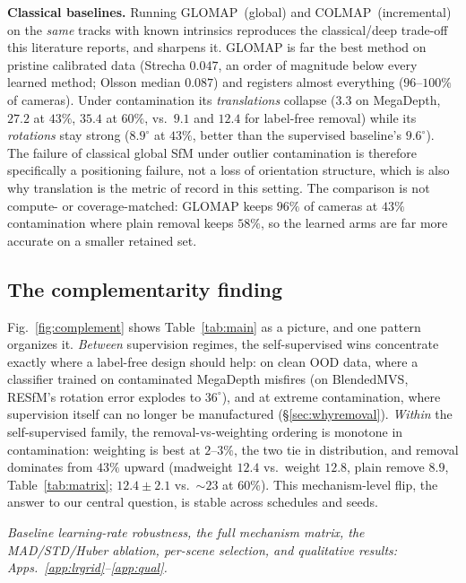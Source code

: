 \documentclass{article}
\newcommand{\mad}{madweight}
\renewcommand{\deg}{^{\circ}}
\begin{document}
\noindent\textbf{Classical baselines.} Running GLOMAP~(global) and COLMAP~(incremental)
on the \emph{same} tracks with known intrinsics reproduces the classical/deep trade-off
this literature reports, and sharpens it. GLOMAP is far the best method on pristine
calibrated data (Strecha $0.047$, an order of magnitude below every learned method;
Olsson median $0.087$) and registers almost everything ($96$--$100\%$ of cameras). Under
contamination its \emph{translations} collapse ($3.3$ on MegaDepth, $27.2$ at $43\%$,
$35.4$ at $60\%$, vs.\ $9.1$ and $12.4$ for label-free removal) while its
\emph{rotations} stay strong ($8.9\deg$ at $43\%$, better than the supervised
baseline's $9.6\deg$). The failure of classical global SfM under outlier contamination is
therefore specifically a positioning failure, not a loss of orientation structure, which
is also why translation is the metric of record in this setting. The comparison is not
compute- or coverage-matched: GLOMAP keeps $96\%$ of cameras at $43\%$ contamination
where plain removal keeps $58\%$, so the learned arms are far more accurate on a smaller
retained set.

\subsection{The complementarity finding}
Fig.~\ref{fig:complement} shows Table~\ref{tab:main} as a picture, and one pattern
organizes it. \emph{Between} supervision regimes, the self-supervised wins concentrate
exactly where a label-free design should help: on clean OOD data, where a classifier
trained on contaminated MegaDepth misfires (on BlendedMVS, RESfM's rotation error explodes
to $36\deg$), and at extreme contamination, where supervision itself can no longer be
manufactured (\S\ref{sec:whyremoval}). \emph{Within} the self-supervised family, the
removal-vs-weighting ordering is monotone in contamination: weighting is best at
$2$--$3\%$, the two tie in distribution, and removal dominates from $43\%$ upward
(\mad{} $12.4$ vs.\ weight $12.8$, plain remove $8.9$, Table~\ref{tab:matrix};
$12.4\pm2.1$ vs.\ $\sim\!23$ at $60\%$). This mechanism-level flip, the answer to our central
question, is stable across schedules and seeds.

\noindent\emph{Baseline learning-rate robustness, the full mechanism matrix, the
MAD/STD/Huber ablation, per-scene selection, and qualitative results:
Apps.~\ref{app:lrgrid}--\ref{app:qual}.}
\end{document}
